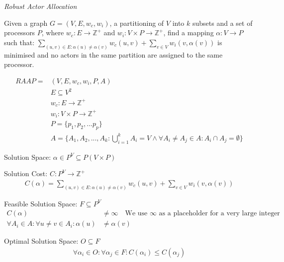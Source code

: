 \documentclass{article}
\begin{document}
\begin{definition}
{\em Robust Actor Allocation}

Given a graph $G=(V,E,w_c,w_i)$, a partitioning of $V$ into $k$ subsets and a set of processors $P$, where $w_c : E \rightarrow \mathbb{Z}^+$ and $w_i : V \times P \rightarrow \mathbb{Z}^+$, find a mapping $\alpha : V \rightarrow P$ such that:
$\displaystyle\sum\limits_{(u,v) \in E : \alpha(u) \neq \alpha(v)} w_c(u,v) + \displaystyle\sum\limits_{v \in V} w_i(v, \alpha(v))$ is minimised and no actors in the same partition are assigned to the same processor.

\begin{align}
	\nonumber RAAP = & (V,E,w_c, w_i, P, A)\\
	\nonumber & E \subseteq V^2\\
	\nonumber & w_c : E \rightarrow \mathbb{Z}^+\\
	\nonumber & w_i : V \times P \rightarrow \mathbb{Z}^+\\
	\nonumber & P = \{p_1, p_2, ...p_p\} \\
	\nonumber & A = \{A_1, A_2, ..., A_k : \displaystyle\bigcup\limits_{i=1}^k A_i = V \wedge \forall A_i \neq A_j \in A : A_i \cap A_j = \emptyset\}
\end{align}

Solution Space: $\alpha \in P^V \subseteq P(V \times P)$

Solution Cost: $C : P^V \rightarrow \mathbb{Z}^+$
\begin{align}
	\nonumber C(\alpha) = \displaystyle\sum\limits_{(u,v) \in E : \alpha(u) \neq \alpha(v)} w_c(u,v) + \displaystyle\sum\limits_{v \in V} w_i(v, \alpha(v))
\end{align}

Feasible Solution Space: $F \subseteq P^V$
\begin{align}
	\nonumber C(\alpha) & \neq \infty \quad \mbox{We use $\infty$ as a placeholder for a very large integer} \\
	\nonumber \forall A_i \in A : \forall u \neq v \in A_i : \alpha(u) & \neq  \alpha(v)
\end{align}

Optimal Solution Space: $O \subseteq F$
\begin{align}
	\nonumber 	\forall \alpha_i \in O : \forall \alpha_j \in F : C(\alpha_i) \leq C(\alpha_j)
\end{align}

\end{definition}
\end{document}
